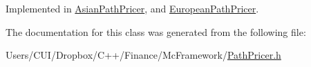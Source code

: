Implemented in \hyperlink{class_asian_path_pricer_adb10ce912ab34560d762ce0523ae394e}{Asian\+Path\+Pricer}, and \hyperlink{class_european_path_pricer_ac12142089ccdc7fe73ba93d66a7964e6}{European\+Path\+Pricer}.



The documentation for this class was generated from the following file\+:\begin{DoxyCompactItemize}
\item 
Users/\+C\+U\+I/\+Dropbox/\+C++/\+Finance/\+Mc\+Framework/\hyperlink{_path_pricer_8h}{Path\+Pricer.\+h}\end{DoxyCompactItemize}
